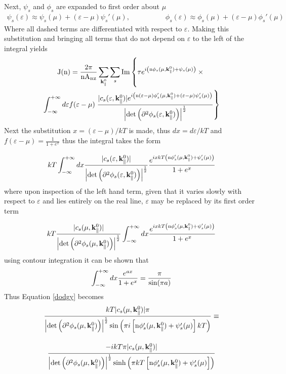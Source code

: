 \documentclass[a4paper, 12pt]{article}
\begin{document}
Next, $\psi_s$ and $\phi_s$ are expanded to first order about $\mu$
\begin{multline}
	\psi_s(\varepsilon) \approx \psi_s(\mu) + (\varepsilon - \mu)\psi_s'(\mu),\quad\quad \quad\quad \quad \phi_s(\varepsilon) \approx \phi_s(\mu) + (\varepsilon - \mu)\phi_s'(\mu)
\end{multline}
	Where all dashed terms are differentiated with respect to $\varepsilon$.
Making this substitution and bringing all terms that do not depend on $\varepsilon$ to the left of the integral yields
\begin{multline}
	{\rm J(n)} = \frac{2\pi}{\rm nA_{\scriptscriptstyle BZ}}\sum_{{\bf k}_{\parallel}^0}\sum_s {\rm Im}\left\{\tau e^{i\left({\rm n}\phi_s(\mu, {\bf k}_\parallel^0)+\psi_s(\mu)\right)} \times \rule{0cm}{0.8cm}\right.\\ \int_{-\infty}^{+\infty}d\varepsilon f(\varepsilon - \mu)\left. \frac{|c_s(\varepsilon, {\bf k}_\parallel^0)|e^{i\left( {\rm n} (\varepsilon - \mu)\phi_s'(\mu, {\bf k}_\parallel^0) + (\varepsilon - \mu)\psi_s'(\mu)\right)} }{\left|{\rm det}\left(\partial^2\phi_s(\varepsilon, {\bf k}_\parallel^0)\right)\right|^{\frac{1}{2}}}\right\}
\end{multline}
Next the substitution $x=(\varepsilon - \mu)/kT$ is made, thus $dx = d\varepsilon/kT$ and $f(\varepsilon - \mu)=\frac{1}{1+e^x}$
thus the integral takes the form
\begin{equation}
	kT\int_{-\infty}^{+\infty}dx \frac{|c_s(\varepsilon, {\bf k}_\parallel^0)|}{\left|{\rm det}\left(\partial^2\phi_s(\varepsilon, {\bf k}_\parallel^0)\right)\right|^\frac{1}{2}} \rule{0cm}{0.8cm} \frac{e^{ixkT\left({\rm n}\phi_s'(\mu, {\bf k}_\parallel^0)+\psi_s'(\mu)\right)}}{1+e^x}
\end{equation}
where upon inspection of the left hand term, given that it varies slowly with respect to $\varepsilon$ and lies entirely on the real line, $\varepsilon$ may be replaced by its first order term
\begin{equation}\label{dodgy}
	kT\frac{|c_s(\mu, {\bf k}_\parallel^0)|}{\left|{\rm det}\left(\partial^2\phi_s(\mu, {\bf k}_\parallel^0)\right)\right|^\frac{1}{2}}\rule{0cm}{0.8cm} \int_{-\infty}^{+\infty}dx \frac{e^{ixkT\left({\rm n}\phi_s'(\mu, {\bf k}_\parallel^0)+\psi_s'(\mu)\right)}}{1+e^x}
\end{equation}
using contour integration it can be shown that{}
\begin{equation}
	\int_{-\infty}^{+\infty} dx \frac{e^{ax}}{1+e^x} = \frac{\pi}{{\rm sin}(\pi a)}
\end{equation}
Thus Equation \eqref{dodgy} becomes
	\begin{multline}
			\frac{kT|c_s(\mu, {\bf k}_\parallel^0)|\pi}{\left|{\rm det}\left(\partial^2\phi_s(\mu,{\bf k}_\parallel^0)\right)\right|^\frac{1}{2} {\rm sin}\left(\pi i\left[{\rm n}\phi_s'(\mu, {\bf k}_\parallel^0)+\psi_s'(\mu)\right]kT\right)}\equiv\\\rule{0cm}{1cm} \frac{-ikT\pi|c_s(\mu, {\bf k}_\parallel^0)|}{\left|{\rm det}\left(\partial^2\phi_s(\mu,{\bf k}_\parallel^0)\right)\right|^\frac{1}{2} {\rm sinh}\left(\pi kT\left[{\rm n}\phi_s'(\mu, {\bf k}_\parallel^0)+\psi_s'(\mu)\right]\right)}
\end{multline}
\end{document}
